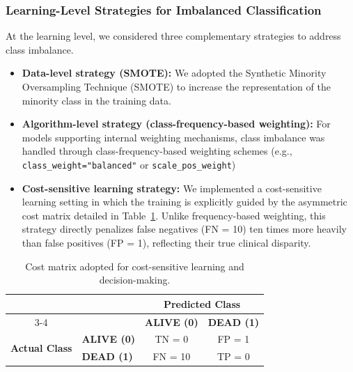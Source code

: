 \documentclass[conference]{IEEEtran}
\begin{document}
\subsubsection{Learning-Level Strategies for Imbalanced Classification}

At the learning level, we considered three complementary strategies to address class imbalance.

\begin{itemize}
    \item \textbf{Data-level strategy (SMOTE):}  
    We adopted the Synthetic Minority Oversampling Technique (SMOTE) to increase the representation of the minority class in the training data.

    \item \textbf{Algorithm-level strategy (class-frequency-based weighting):}  
    For models supporting internal weighting mechanisms, class imbalance was handled through class-frequency-based weighting schemes (e.g., \texttt{class\_weight="balanced"} or \texttt{scale\_pos\_weight})

    \item \textbf{Cost-sensitive learning strategy:}  
   We implemented a cost-sensitive learning setting in which the training is explicitly guided by the asymmetric cost matrix detailed in Table~\ref{tab:cost-matrix}. Unlike frequency-based weighting, this strategy directly penalizes false negatives (FN = 10) ten times more heavily than false positives (FP = 1), reflecting their true clinical disparity.
   
\end{itemize}

\begin{table}[h]
    \centering
    \caption{Cost matrix adopted for cost-sensitive learning and decision-making.}
    \label{tab:cost-matrix}
    \begin{threeparttable}
        \begin{tabular}{clcc}
            \toprule
            & & \multicolumn{2}{c}{\textbf{Predicted Class}} \\
            \cmidrule(lr){3-4}
            & & \textbf{ALIVE (0)} & \textbf{DEAD (1)} \\
            \midrule
            \multirow{2}{*}{{\textbf{Actual Class}}} 
            & \textbf{ALIVE (0)} & TN = 0 & FP = 1 \\
            & \textbf{DEAD (1)}  & FN = 10 & TP = 0 \\
            \bottomrule
        \end{tabular}
    \end{threeparttable}
\end{table}
\end{document}
